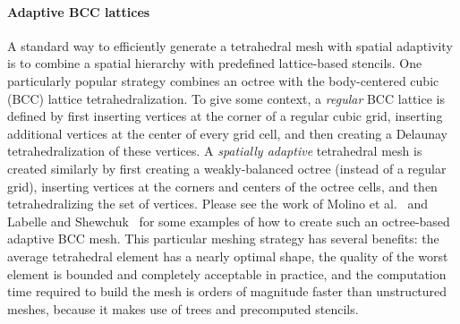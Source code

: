 \paragraph*{Adaptive BCC lattices} A standard way to efficiently generate a tetrahedral mesh with spatial adaptivity is to combine a spatial hierarchy with predefined lattice-based stencils. One particularly popular strategy combines an octree with the body-centered cubic (BCC) lattice tetrahedralization. To give some context, a {\em regular} BCC lattice is defined by first inserting vertices at the corner of a regular cubic grid, inserting additional vertices at the center of every grid cell, and then creating a Delaunay tetrahedralization of these vertices. A {\em spatially adaptive} tetrahedral mesh is created similarly by first creating a weakly-balanced octree (instead of a regular grid), inserting vertices at the corners and centers of the octree cells, and then tetrahedralizing the set of vertices. Please see the work of Molino et al.~\cite{Molino2003} and Labelle and Shewchuk~\cite{Labelle2007} for some examples of how to create such an octree-based adaptive BCC mesh. This particular meshing strategy has several benefits: the average tetrahedral element has a nearly optimal shape, the quality of the worst element is bounded and completely acceptable in practice, and the computation time required to build the mesh is orders of magnitude faster than unstructured meshes, because it makes use of trees and precomputed stencils.

